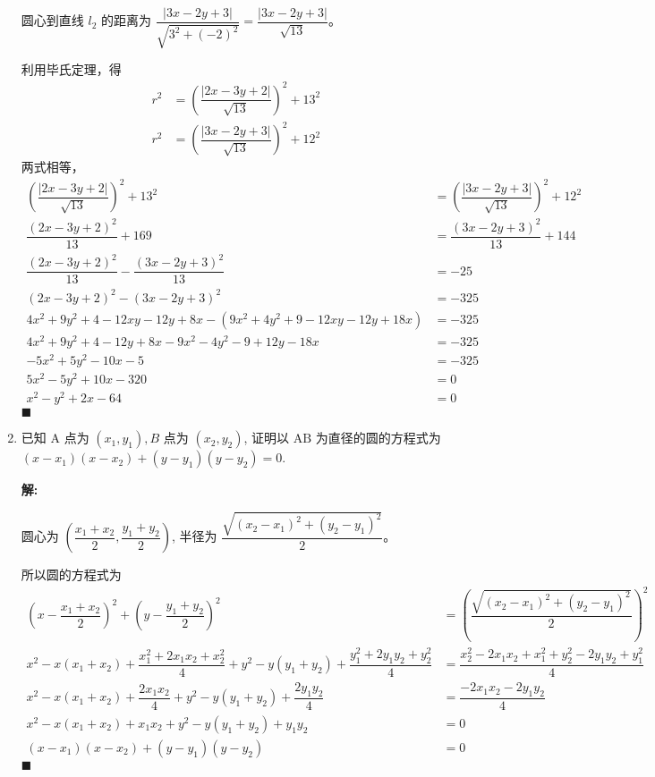 \documentclass[10pt]{article}
\newcommand{\sol}{\textbf{解:} }
\begin{document}
\begin{enumerate}[leftmargin=*]
  圆心到直线 $l_{2}$ 的距离为 $\dfrac{|3x-2y+3|}{\sqrt{3^{2}+(-2)^{2}}} = \dfrac{|3x-2y+3|}{\sqrt{13}}$。

  利用毕氏定理，得
  \begin{align*}
    r^{2} &= \left(\dfrac{|2x-3y+2|}{\sqrt{13}}\right)^{2} + 13^{2}\\
    r^2 &= \left(\dfrac{|3x-2y+3|}{\sqrt{13}}\right)^{2} + 12^{2}
  \end{align*}
  两式相等，
  \begin{align*}
    \left(\dfrac{|2x-3y+2|}{\sqrt{13}}\right)^{2} + 13^{2} &= \left(\dfrac{|3x-2y+3|}{\sqrt{13}}\right)^{2} + 12^{2}\\
    \dfrac{(2x-3y+2)^{2}}{13} + 169 &= \dfrac{(3x-2y+3)^{2}}{13} + 144\\
    \dfrac{(2x-3y+2)^{2}}{13} - \dfrac{(3x-2y+3)^{2}}{13} & = -25\\
    (2x-3y+2)^{2} - (3x-2y+3)^{2} &= -325\\
    4x^{2} + 9y^{2} + 4 - 12xy - 12y + 8x - (9x^{2} + 4y^{2} + 9 - 12xy - 12y + 18x) &= -325\\
    4x^{2} + 9y^{2} + 4 - 12y + 8x - 9x^{2} - 4y^{2} - 9 + 12y - 18x &= -325\\
    -5x^{2} + 5y^{2} - 10x - 5 &= -325\\
    5x^{2} - 5y^{2} + 10x - 320 &= 0\\
    x^{2} - y^{2} + 2x - 64 &= 0
  \end{align*} \hfill$\blacksquare$

  \item 已知 $\mathrm{A}$ 点为 $\left(x_{1}, y_{1}\right), B$ 点为 $\left(x_{2}, y_{2}\right)$, 证明以 $\mathrm{AB}$ 为直径的圆的方程式为 $\left(x-x_{1}\right)\left(x-x_{2}\right)+\left(y-y_{1}\right)\left(y-y_{2}\right)=0$.
  
  \sol{}

  圆心为 $\left(\dfrac{x_{1}+x_{2}}{2}, \dfrac{y_{1}+y_{2}}{2}\right)$, 半径为 $\dfrac{\sqrt{(x_{2}-x_{1})^{2}+(y_{2}-y_{1})^{2}}}{2}$。

  所以圆的方程式为
  \begin{align*}
    \left(x-\dfrac{x_{1}+x_{2}}{2}\right)^{2} + \left(y-\dfrac{y_{1}+y_{2}}{2}\right)^{2} &= \left(\dfrac{\sqrt{(x_{2}-x_{1})^{2}+(y_{2}-y_{1})^{2}}}{2}\right)^{2}\\
    x^2 - x(x_{1}+x_{2}) + \dfrac{x^{2}_{1}+2x_{1}x_{2}+x^{2}_{2}}{4} + y^{2} - y(y_{1}+y_{2}) + \dfrac{y^{2}_{1}+2y_{1}y_{2}+y^{2}_{2}}{4} &= \dfrac{x^{2}_{2}-2x_{1}x_{2}+x^{2}_{1}+y^{2}_{2}-2y_{1}y_{2}+y^{2}_{1}}{4}\\
    x^2 - x(x_{1}+x_{2}) + \dfrac{2x_{1}x_{2}}{4} + y^{2} - y(y_{1}+y_{2}) + \dfrac{2y_{1}y_{2}}{4} &= \dfrac{-2x_{1}x_{2}-2y_{1}y_{2}}{4}\\
    x^2 - x(x_{1}+x_{2}) + x_{1}x_{2} + y^{2} - y(y_{1}+y_{2}) + y_{1}y_{2} &= 0\\
    (x-x_{1})(x-x_{2}) + (y-y_{1})(y-y_{2}) &= 0
   \end{align*} \hfill$\blacksquare$


\end{enumerate}
\end{document}
